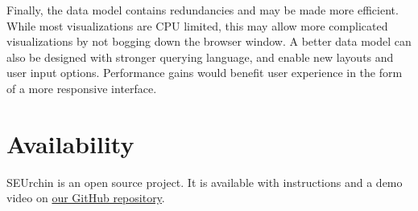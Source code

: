 \documentclass[conference]{IEEEtran}
\begin{document}
Finally, the data model contains redundancies and may be made more efficient. While most visualizations are CPU limited, this may allow more complicated visualizations by not bogging down the browser window. A better data model can also be designed with stronger querying language, and enable new layouts and user input options. Performance gains would benefit user experience in the form of a more responsive interface.


\section{Availability}\label{sec:available}
SEUrchin is an open source project. It is available with instructions and a demo video on \href{https://github.com/mmaps/selinux/tree/master/policycoreutils/seviz}{our GitHub repository}\cite{SEUrchin}.
%
%

\end{document}
